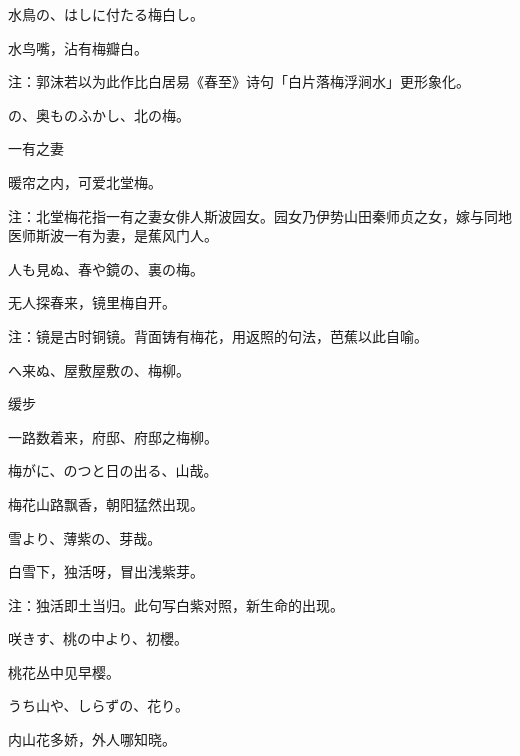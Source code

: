 \begin{haiku}
    {\FH 水鳥の、はしに付たる梅白し。}

    {\FK 水鸟嘴，沾有梅瓣白。}

    {\FT 注：郭沫若以为此作比白居易《春至》诗句「白片落梅浮涧水」更形象化。}
\end{haiku}

\begin{haiku}
    {\FH {}の、奥ものふかし、北の梅。}

    {\FK 一有之妻}

    {\FK 暖帘之内，可爱北堂梅。}

    {\FT 注：北堂梅花指一有之妻女俳人斯波园女。园女乃伊势山田秦师贞之女，嫁与同地医师斯波一有为妻，是蕉风门人。}
\end{haiku}

\begin{haiku}
    {\FH 人も見ぬ、春や鏡の、裏の梅。}

    {\FK 无人探春来，镜里梅自开。}

    {\FT 注：镜是古时铜镜。背面铸有梅花，用返照的句法，芭蕉以此自喻。}
\end{haiku}

\begin{haiku}
    {\FH {}へ来ぬ、屋敷屋敷の、梅柳。}

    {\FK 缓步}

    {\FK 一路数着来，府邸、府邸之梅柳。}
\end{haiku}

\begin{haiku}
    {\FH 梅がに、のつと日の出る、山哉。}

    {\FK 梅花山路飘香，朝阳猛然出现。}
\end{haiku}

\begin{haiku}
    {\FH 雪より、薄紫の、芽哉。}

    {\FK 白雪下，独活呀，冒出浅紫芽。}

    {\FT 注：独活即土当归。此句写白紫对照，新生命的出现。}
\end{haiku}

\begin{haiku}
    {\FH 咲きす、桃の中より、初櫻。}

    {\FK 桃花丛中见早樱。}
\end{haiku}

\begin{haiku}
    {\FH うち山や、しらずの、花り。}

    {\FK 内山花多娇，外人哪知晓。}
\end{haiku}

